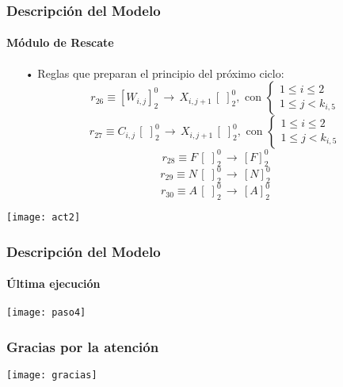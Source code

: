 \documentclass[10pt,a4paper]{beamer}
\theoremstyle{definition}
\theoremstyle{remark}
\begin{document}
\begin{frame}
\frametitle{Descripción del Modelo}
\framesubtitle{Módulo de Rescate}
\begin{small}
\begin{itemize}
\item[•] Reglas que preparan el principio del próximo ciclo:
$$r_{26} \equiv [W_{i,j}]^0_2 \, \longrightarrow \,  X_{i,j+1} \, [\;]^0_2 , \text{ con } \left \{ \begin{matrix} 1 \leq i \leq 2
\\ 1\leq j < k_{i,5} \end{matrix}\right. $$
$$r_{27} \equiv C_{i,j} \, [\;]^0_2 \, \longrightarrow \, X_{i,j+1}\, [\;]^0_2 , \text{ con } \left \{ \begin{matrix} 1 \leq i \leq 2
\\ 1\leq j < k_{i,5} \end{matrix}\right. $$
$$r_{28} \equiv F \, [\;]^0_2 \, \longrightarrow \, [F]^0_2$$
$$r_{29} \equiv N \, [\;]^0_2 \, \longrightarrow \, [N]^0_2$$
$$r_{30} \equiv A \, [\;]^0_2 \, \longrightarrow \, [A]^0_2$$
\end{itemize}
\end{small}
\end{frame}

\begin{frame}
\begin{center}
\texttt{[image: act2]}
\end{center}
\end{frame}

\begin{frame}
\frametitle{Descripción del Modelo}
\framesubtitle{Última ejecución}
\begin{center}
\texttt{[image: paso4]}
\end{center}
\end{frame}

\begin{frame}
\frametitle{Gracias por la atención}
\texttt{[image: gracias]}
\end{frame}
\end{document}
